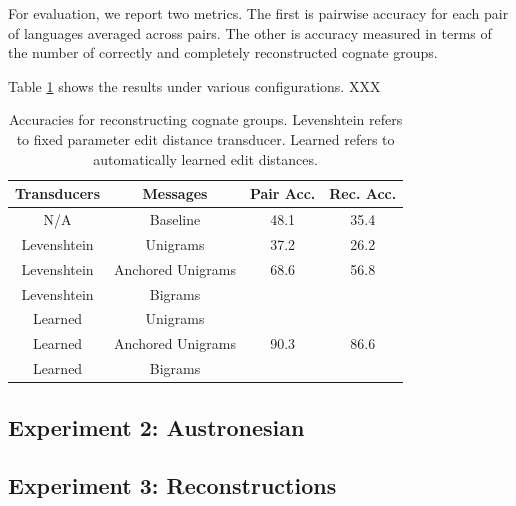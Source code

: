 \documentclass[11pt,a4paper]{article}
\begin{document}
For evaluation, we report two metrics. The first is pairwise accuracy
for each pair of languages averaged across pairs. The other is
accuracy measured in terms of the number of correctly and completely
reconstructed cognate groups.

Table \ref{tbl:exp1} shows the results under various configurations. XXX

\begin{table}
  \centering
  \begin{tabular}{|c|c|c|c|}
    Transducers & Messages & Pair Acc. & Rec. Acc.\\
    \hline
    N/A & Baseline & 48.1 & 35.4  \\
    \hline
    Levenshtein&Unigrams & 37.2 & 26.2 \\
    Levenshtein&Anchored Unigrams & 68.6 & 56.8\\
    Levenshtein&Bigrams & & \\
    \hline 
    Learned&Unigrams & & \\
    Learned&Anchored Unigrams & 90.3  & 86.6 \\
    Learned&Bigrams & & \\
  \end{tabular}
  \caption{Accuracies for reconstructing cognate groups. Levenshtein
  refers to fixed parameter edit distance transducer. Learned refers
  to automatically learned edit distances.}
  \label{tbl:exp1}
\end{table}

\subsection{Experiment 2: Austronesian}

\subsection{Experiment 3: Reconstructions}
\end{document}
